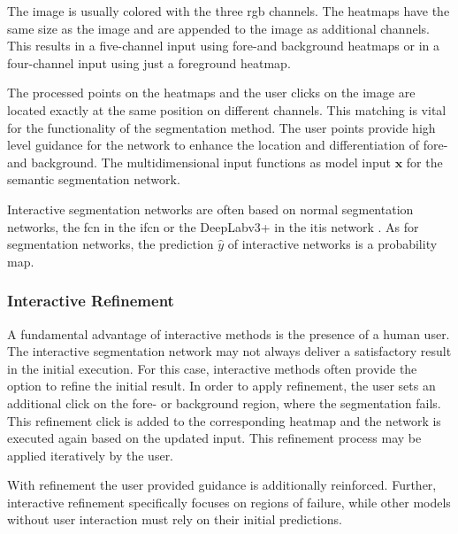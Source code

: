The image is usually colored with the three \gls{rgb} channels.
The heatmaps have the same size as the image and are appended to the image as additional channels.
This results in a five-channel input using fore-and background heatmaps or in a four-channel input using just a foreground heatmap.

The processed points on the heatmaps and the user clicks on the image are located exactly at the same position on different channels.
This matching is vital for the functionality of the segmentation method.
The user points provide high level guidance for the network to enhance the location and differentiation of fore- and background.
The multidimensional input functions as model input $\textbf{x}$ for the semantic segmentation network.

Interactive segmentation networks are often based on normal segmentation networks, \eg the \gls{fcn} in the \gls{ifcn} \cite{Xu16-InteractiveObjectSelection} or the DeepLabv3+ in the \gls{itis} network \cite{MVL18-ITIS}.
As for segmentation networks, the prediction $\hat{y}$ of interactive networks is a probability map.

\subsubsection{Interactive Refinement}
A fundamental advantage of interactive methods is the presence of a human user.
The interactive segmentation network may not always deliver a satisfactory result in the initial execution.
For this case, interactive methods often provide the option to refine the initial result.
In order to apply refinement, the user sets an additional click on the fore- or background region, where the segmentation fails.
This refinement click is added to the corresponding heatmap and the network is executed again based on the updated input.
This refinement process may be applied iteratively by the user.

With refinement the user provided guidance is additionally reinforced.
Further, interactive refinement specifically focuses on regions of failure, while other models without user interaction must rely on their initial predictions.


